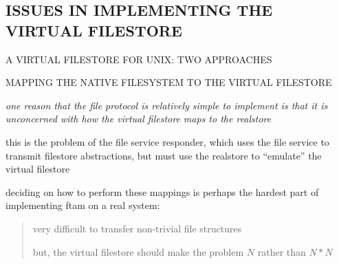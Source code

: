 
\begin{bwslide}
\part	{ISSUES IN IMPLEMENTING THE VIRTUAL FILESTORE}

\begin{nrtc}\bf
\item	A VIRTUAL FILESTORE FOR UNIX: TWO APPROACHES

\item	MAPPING THE NATIVE FILESYSTEM TO THE VIRTUAL FILESTORE
\end{nrtc}
\end{bwslide}


\begin{note}\em
one reason that the file protocol is relatively simple to implement
is that it is unconcerned with how the virtual filestore maps to the
realstore

this is the problem of the file service responder, which uses the file
service to transmit filestore abstractions, but must use the realstore
to ``emulate'' the virtual filestore

deciding on how to perform these mappings is perhaps the hardest part
of implementing ftam on a real system:
\begin{quote}
very difficult to transfer non-trivial file structures

but, the virtual filestore should make the problem $N$ rather than $N*N$
\end{quote}
\end{note}


